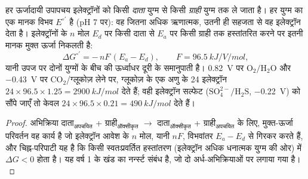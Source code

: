 \begin{theorem}\label{thm:b2:microbial-metabolism:redox}
हर ऊर्जादायी उपापचय इलेक्ट्रॉनों को किसी \emph{दाता} युग्म से किसी
\emph{ग्राही} युग्म तक ले जाता है। हर युग्म का एक मानक विभव
$E^{\circ\prime}$ है (pH 7 पर): वह जितना अधिक ऋणात्मक, उतनी ही सहजता से
वह इलेक्ट्रॉन देता है। इलेक्ट्रॉनों के $n$ मोल $E_d$ पर किसी दाता से
$E_a$ पर किसी ग्राही तक हस्तांतरित करने पर इतनी मानक मुक्त ऊर्जा
निकलती है:
\[
\Delta G^{\circ\prime} = -\,n F\,(E_a - E_d), \qquad F = \qty{96.5}{kJ/V/mol},
\]
यानी उपज \emph{} पर दोनों युग्मों के बीच की
ऊर्ध्वाधर दूरी के समानुपाती है। \qty{+0.82}{V} पर
$\mathrm{O_2/H_2O}$ और \qty{-0.43}{V} पर $\mathrm{CO_2}$/ग्लूकोज़
लेने पर, ग्लूकोज़ के एक अणु के 24 इलेक्ट्रॉन
$24\times 96.5\times 1.25 = \qty{2900}{kJ/mol}$ देते हैं; वही
इलेक्ट्रॉन सल्फेट ($\mathrm{SO_4^{2-}/H_2S}$, \qty{-0.22}{V}) को सौंपे
जाएँ तो केवल $24\times 96.5\times 0.21 = \qty{490}{kJ/mol}$ देते हैं।
\end{theorem}
\begin{proof}
अभिक्रिया दाता$_{\text{अपचयित}}$ + ग्राही$_{\text{ऑक्सीकृत}}$
$\to$ दाता$_{\text{ऑक्सीकृत}}$ + ग्राही$_{\text{अपचयित}}$ के लिए,
मुक्त-ऊर्जा परिवर्तन वह कार्य है जो इलेक्ट्रॉन आवेश के $n$ मोल, यानी $nF$,
विभवांतर $E_a - E_d$ से गिरकर करते हैं, और चिह्न-परिपाटी यह है कि किसी
स्वतःप्रवर्तित हस्तांतरण (इलेक्ट्रॉन अधिक धनात्मक युग्म की ओर) में
$\Delta G < 0$ होता है। यह वर्ष 1 के खंड का नर्न्स्ट संबंध है, जो दो
अर्ध-अभिक्रियाओं पर लगाया गया है।
\end{proof}

